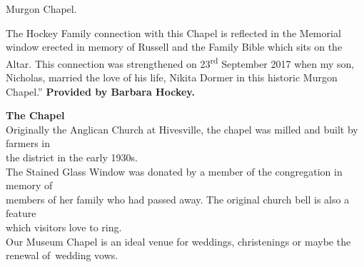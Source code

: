 Murgon Chapel.

The Hockey Family connection with this Chapel is reflected in the
Memorial window erected in memory of Russell and the Family Bible which
sits on the Altar. This connection was strengthened on
23\textsuperscript{rd} September 2017 when my son, Nicholas, married the
love of his life, Nikita Dormer in this historic Murgon Chapel.''
\textbf{Provided by Barbara Hockey.}


\textbf{The Chapel}\\
Originally the Anglican Church at Hivesville, the chapel was milled and
built by farmers in\\
the district in the early 1930s.\\
The Stained Glass Window was donated by a member of the congregation in
memory of\\
members of her family who had passed away. The original church bell is
also a feature\\
which visitors love to ring.\\
Our Museum Chapel is an ideal venue for weddings, christenings or maybe
the renewal of~wedding vows.

\printendnotes
